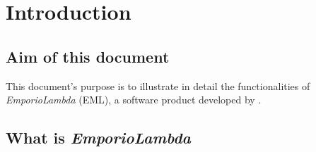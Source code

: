\section{Introduction}
\subsection{Aim of this document}
This document's purpose is to illustrate in detail the functionalities of \textit{EmporioLambda} (EML), a software product developed by \Omicron .
\subsection{What is \textit{EmporioLambda}}
